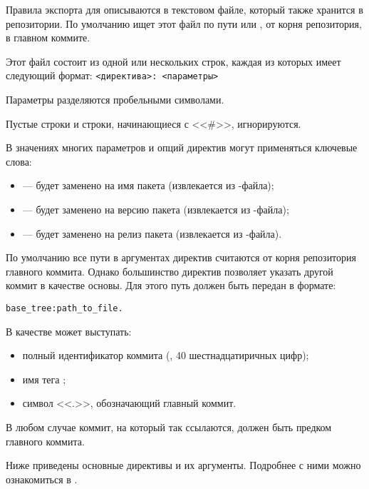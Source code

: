 Правила экспорта для  описываются в текстовом файле, который также хранится в репозитории.
По умолчанию  ищет этот файл по пути  или , от корня репозитория,
в главном коммите.

Этот файл состоит из одной или нескольких строк, каждая из которых имеет следующий формат: \verb!<директива>: <параметры>!

Параметры разделяются пробельными символами.

Пустые строки и строки, начинающиеся с <<\#>>, игнорируются.

В значениях многих параметров и опций директив могут применяться ключевые слова:
\begin{itemize}
	\item {} --- будет заменено на имя пакета (извлекается из -файла);
	\item {} --- будет заменено на версию пакета (извлекается из -файла);
	\item {} --- будет заменено на релиз пакета (извлекается из -файла).
\end{itemize}


По умолчанию все пути в аргументах директив считаются от корня репозитория главного коммита.
Однако большинство директив позволяет указать другой коммит в качестве основы. Для этого путь
должен быть передан в формате:
\begin{verbatim}
base_tree:path_to_file.
\end{verbatim}

В качестве  может выступать:
\begin{itemize}
	\item полный идентификатор коммита (, 40 шестнадцатиричных цифр);
	\item имя тега ;
	\item символ <<.>>, обозначающий главный коммит.
\end{itemize}

В любом случае коммит, на который так ссылаются, должен быть предком главного коммита.


Ниже приведены основные директивы  и их аргументы. Подробнее с ними можно
ознакомиться в .

